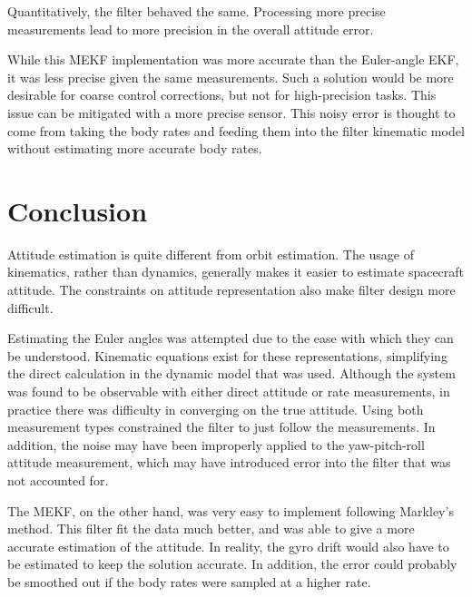 \documentclass[]{aiaa-tc}%
\begin{document}
Quantitatively, the filter behaved the same. Processing more precise measurements lead to more precision in the overall attitude error.

	\vspace{5 mm}

While this MEKF implementation was more accurate than the Euler-angle EKF, it was less precise given the same measurements. Such a solution would be more desirable for coarse control corrections, but not for high-precision tasks. This issue can be mitigated with a more precise sensor. This noisy error is thought to come from taking the body rates and feeding them into the filter kinematic model without estimating more accurate body rates.

	\section{Conclusion}

Attitude estimation is quite different from orbit estimation. The usage of kinematics, rather than dynamics, generally makes it easier to estimate spacecraft attitude\cite{MarklyRepresentations}. The constraints on attitude representation also make filter design more difficult.

	\vspace{5 mm}

Estimating the Euler angles was attempted due to the ease with which they can be understood. Kinematic equations exist for these representations, simplifying the direct calculation in the dynamic model that was used. Although the system was found to be observable with either direct attitude or rate measurements, in practice there was difficulty in converging on the true attitude. Using both measurement types constrained the filter to just follow the measurements. In addition, the noise may have been improperly applied to the yaw-pitch-roll attitude measurement, which may have introduced error into the filter that was not accounted for.

	\vspace{5 mm}

The MEKF, on the other hand, was very easy to implement following Markley's\cite{MarkleyAtt} method. This filter fit the data much better, and was able to give a more accurate estimation of the attitude. In reality, the gyro drift would also have to be estimated to keep the solution accurate. In addition, the error could probably be smoothed out if the body rates were sampled at a higher rate.
\end{document}
